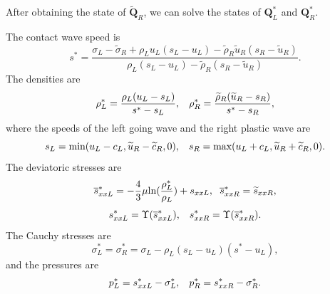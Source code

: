 \documentclass[review]{elsarticle}
\begin{document}
After obtaining the state of $\widetilde{\mathbf{Q}}_R$, we can solve the states of $\mathbf{Q}_L^*$ and  $\mathbf{Q}_R^*$.

The contact wave speed is
\begin{equation}
  s^* = \frac{\sigma_L-\widetilde{\sigma}_R+\rho_L u_L(s_L-u_L)-\widetilde{\rho}_R \widetilde{u}_R(s_R-\widetilde{u}_R)}{\rho_L(s_L-u_L)-\widetilde{\rho}_R(s_R-\widetilde{u}_R)}.
\end{equation}
The densities are
\begin{equation}\label{eq:rhoLs}
  \rho_L^* = \frac{\rho_L(u_L-s_L)}{s^*-s_L}, \hspace{0.3cm}  \rho_R^* = \frac{\widetilde{\rho}_R(\widetilde{u}_R-s_R)}{s^*-s_R},
\end{equation}
where the  speeds of the left going wave and the right plastic wave are
    \begin{equation}
      s_L = \text{min} (u_L-c_L, \widetilde{u}_R-\widetilde{c}_R,0), \hspace{0.3cm} s_R = \text{max}(u_L+c_L, \widetilde{u}_R+\widetilde{c}_R,0).
    \end{equation}
    The deviatoric stresses are
\begin{equation}
  \overline{s}_{xxL}^*=-\frac{4}{3}\mu\text{ln}(\frac{\rho_L^*}{\rho_L})+s_{xxL},\hspace{0.2cm}  \overline{s}_{xxR}^*=\widetilde{s}_{xxR},
\end{equation}
\begin{equation}
  s_{xxL}^* = \Upsilon(\overline{s}_{xxL}^*), \hspace{0.3cm}  s_{xxR}^* = \Upsilon(\overline{s}_{xxR}^*).
\end{equation}
The Cauchy stresses are
\begin{equation}
  \sigma_L^*=\sigma_R^*=\sigma_L -\rho_L (s_L-u_L)(s^*-u_L),
\end{equation}
and the pressures are
\begin{equation}
  p_L^* = s_{xxL}^* - \sigma_L^*, \hspace{0.3cm}   p_R^* = s_{xxR}^* - \sigma_R^*.
\end{equation}
\end{document}
